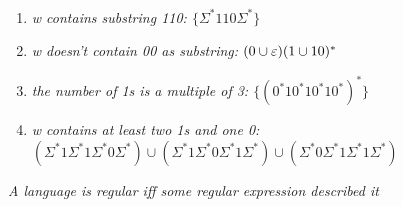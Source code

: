 \documentclass{article}
\begin{document}
\begin{exercises}
    \

    \begin{enumerate}
        \item \textit{w contains substring 110: $\{\Sigma^*110\Sigma^*\}$}
        \item \textit{w doesn't contain 00 as substring: $(0\cup\varepsilon)(1\cup10)^*$}
        \item \textit{the number of 1s is a multiple of 3: $\{(0^*10^*10^*10^*)^*\}$}
        \item \textit{w contains at least two 1s and one 0: $(\Sigma^*1\Sigma^*1\Sigma^*0\Sigma^*)\cup(\Sigma^*1\Sigma^*0\Sigma^*1\Sigma^*)\cup(\Sigma^*0\Sigma^*1\Sigma^*1\Sigma^*)$}
    \end{enumerate}
\end{exercises}

\begin{thm}
    \textit{A language is regular iff some regular expression described it}
\end{thm}

\newpage
\end{document}
